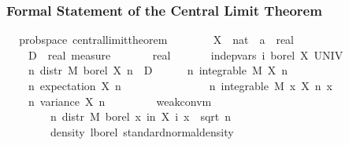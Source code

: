 \documentclass{beamer}
\begin{document}
\begin{frame}
\frametitle{Formal Statement of the Central Limit Theorem}
\begin{isabellebody}
\isamarkupfalse%
\ {\isacharparenleft}\,\ prob{\isacharunderscore}space{\isacharparenright}\ central{\isacharunderscore}limit{\isacharunderscore}theorem{\isacharcolon}\isanewline
\ \ \ \isanewline
\ \ \ \ X\ {\isacharcolon}{\isacharcolon}\ {\isachardoublequoteopen}nat\ {\isasymRightarrow}\ {\isacharprime}a\ {\isasymRightarrow}\ real{\isachardoublequoteclose}\ \isanewline
\ \ \ \ D\ {\isacharcolon}{\isacharcolon}\ {\isachardoublequoteopen}real\ measure{\isachardoublequoteclose}\ \isanewline
\ \ \ \ {\isasymsigma}\ {\isacharcolon}{\isacharcolon}\ real\isanewline
\ \ \isanewline
\ \ \ \ {\isachardoublequoteopen}indep{\isacharunderscore}vars\ {\isacharparenleft}{\isasymlambda}i{\isachardot}\ borel{\isacharparenright}\ X\ UNIV{\isachardoublequoteclose}\ \isanewline
\ \ \ \ {\isachardoublequoteopen}{\isasymAnd}n{\isachardot}\ {distr}\ M\ borel\ {\isacharparenleft}X\ n{\isacharparenright}\ {\isacharequal}\ D{\isachardoublequoteclose}
\ \isanewline
\ \ \ \ {\isachardoublequoteopen}{\isasymAnd}n{\isachardot}\ integrable\ M\ {\isacharparenleft}X\ n{\isacharparenright}{\isachardoublequoteclose}\ \isanewline
\ \ \ \ {\isachardoublequoteopen}{\isasymAnd}n{\isachardot}\ expectation\ {\isacharparenleft}X\ n{\isacharparenright}\ {\isacharequal}\ {}{\isachardoublequoteclose}
\ \isanewline
\ \ \ \ {\isachardoublequoteopen}{\isasymsigma}\ {\isachargreater}\ {}{\isachardoublequoteclose}\ \isanewline
\ \ \ \ {\isachardoublequoteopen}{\isasymAnd}n{\isachardot}\ integrable\ M\ {\isacharparenleft}{\isasymlambda}x{\isachardot}\ {\isacharparenleft}X\ n\ x{\isacharparenright}\ \isanewline
\ \ \ \ {\isachardoublequoteopen}{\isasymAnd}n{\isachardot}\ variance\ {\isacharparenleft}X\ n{\isacharparenright}\ {\isacharequal}\ {\isasymsigma}\isanewline
\ \ \isanewline
\ \ \ \ {\isachardoublequoteopen}weak{\isacharunderscore}conv{\isacharunderscore}m\ \isanewline
\ \ \ \ \ \ \ \ {\isacharparenleft}{\isasymlambda}n{\isachardot}\ {distr}\ M\ {borel}\ {\isacharparenleft}{\isasymlambda}x{\isachardot}\ {\isasymSum}i{\isacharless}n{\isachardot}\ X\ i\ x\ {\isacharslash}\ sqrt\ {\isacharparenleft}n\ {\isacharasterisk}\ {\isasymsigma}\isanewline
\ \ \ \ \ \ \ \ {\isacharparenleft}{density}\ {lborel}\ standard{\isacharunderscore}normal{\isacharunderscore}density{\isacharparenright}{\isachardoublequoteclose}
\end{isabellebody}
\end{frame}
\end{document}
